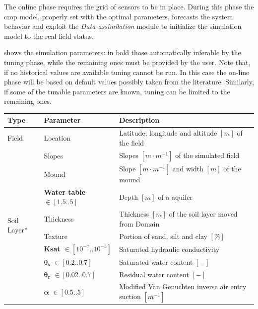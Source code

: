The online phase requires the grid of sensors to be in place. During this phase the crop model, properly set with the optimal parameters, forecasts the system behavior and exploit the \emph{Data assimilation} module to initialize the simulation model to the real field status.


 shows the simulation parameters: in bold those automatically inferable by the tuning phase, while the remaining ones must be provided by the user. Note that, if no historical values are available tuning cannot be run. In this case the on-line phase will be based on default values possibly taken from the literature. Similarly, if some of the tunable parameters are known, tuning can be limited to the remaining ones.

\begin{table}[H]
	\centering
	\scriptsize
	\begin{tabular}{p{1.2cm}p{5cm}p{7.5cm}}
 		\textbf{Type} & \textbf{Parameter} & \textbf{Description} \\
		\hline%
		Field & Location &  Latitude, longitude and altitude $[m]$ of the field\\
		& Slopes & Slopes $[m \cdot m^{-1}]$ of the simulated field \\
		& Mound & Slope $[m \cdot m^{-1}]$ and width $[m]$ of the mound \\
		& \textbf{Water table} $\in [1.5..5]$ & Depth $[m]$ of a aquifer\\ 
		\hline%
		\multirow{2}{1cm}{Soil Layer*} & Thickness & Thickness $[m]$ of the soil layer moved from Domain\\
		& Texture & Portion of sand, silt and clay $[\%]$ \\ %
		& \textbf{Ksat $\in [10^{-7}..10^{-3}]$ } & Saturated hydraulic conductivity  \\ %
		& $\pmb{\theta_s}$ $\in [0.2..0.7]$ & Saturated water content $[-]$\\  
		& $\pmb{\theta_r}$ $\in [0.02..0.7]$ & Residual water content $[-]$ \\  
		& $\pmb{\alpha}$ $\in [0.5..5]$ & Modified Van Genuchten inverse air entry suction $[m^{-1}]$\\  

\end{tabular}
\end{table}
